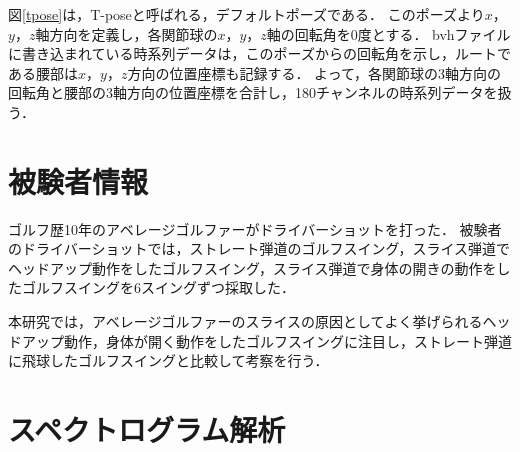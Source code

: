 図\ref{tpose}は，T-poseと呼ばれる，デフォルトポーズである．
このポーズより$x$，$y$，$z$軸方向を定義し，各関節球の$x$，$y$，$z$軸の回転角を0度とする．
bvhファイルに書き込まれている時系列データは，このポーズからの回転角を示し，ルートである腰部は$x$，$y$，$z$方向の位置座標も記録する．
よって，各関節球の3軸方向の回転角と腰部の3軸方向の位置座標を合計し，180チャンネルの時系列データを扱う．

\section{被験者情報}
ゴルフ歴10年のアベレージゴルファーがドライバーショットを打った．
被験者のドライバーショットでは，ストレート弾道のゴルフスイング，スライス弾道でヘッドアップ動作をしたゴルフスイング，スライス弾道で身体の開きの動作をしたゴルフスイングを6スイングずつ採取した．

本研究では，アベレージゴルファーのスライスの原因としてよく挙げられるヘッドアップ動作，身体が開く動作をしたゴルフスイングに注目し，ストレート弾道に飛球したゴルフスイングと比較して考察を行う．

\section{スペクトログラム解析}
